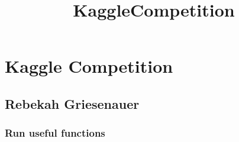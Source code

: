 \documentclass[11pt]{article}
\title{KaggleCompetition}
\begin{document}
    
    
    \maketitle
    
    

    
    \section{Kaggle Competition}\label{kaggle-competition}

\subsection{Rebekah Griesenauer}\label{rebekah-griesenauer}

    \subsubsection{Run useful functions}\label{run-useful-functions}
\end{document}
